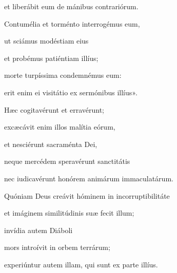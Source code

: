 {\noindent et liberábit eum de mánibus contrariórum.

\noindent Contumélia et torménto interrogémus eum,

\noindent ut sciámus modéstiam eius

\noindent et probémus patiéntiam illíus;

\noindent morte turpíssima condemnémus eum:

\noindent erit enim ei visitátio ex sermónibus illíus».

\noindent Hæc cogitavérunt et erravérunt;

\noindent excæcávit enim illos malítia eórum,

\noindent et nesciérunt sacraménta Dei,

\noindent neque mercédem speravérunt sanctitátis

\noindent nec iudicavérunt honórem animárum immaculatárum.

\noindent Quóniam Deus creávit hóminem in incorruptibilitáte

\noindent et imáginem similitúdinis suæ fecit illum;

\noindent invídia autem Diáboli

\noindent mors introívit in orbem terrárum;

\noindent experiúntur autem illam, qui sunt ex parte illíus.}
\newcommand{\responsoriumi}{\pars{Responsorium 1.} \scriptura{\Rbardot{} Sap. 2, 12-20 \Vbardot{} ibidem; \textbf{H172}}

\vspace{-5mm}

\responsorium{I}{temporalia/resp-dixeruntimpii.gtex}{}}
